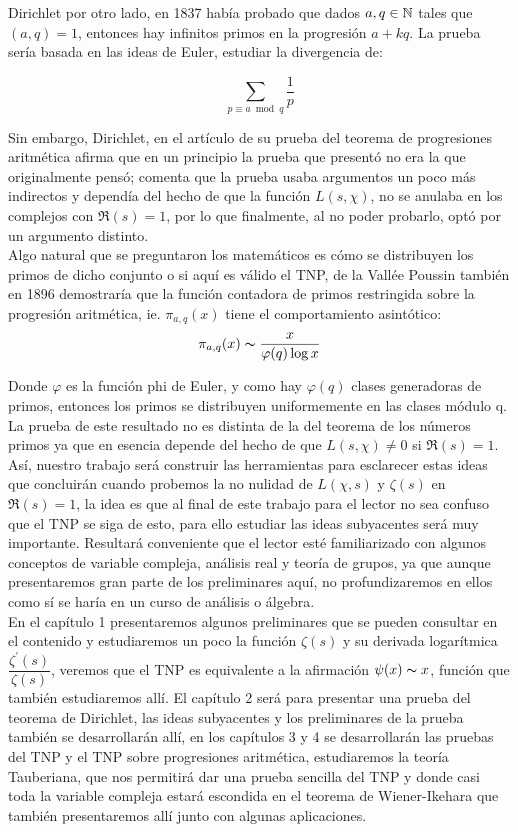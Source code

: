 Dirichlet por otro lado, en 1837 había probado que dados $a,q \in \mathbb{N}$ tales que $(a,q)=1$, entonces hay infinitos primos en la progresión $a+kq$. La prueba sería basada en las ideas de Euler, estudiar  la divergencia de:

$$\sum_{p \equiv a \bmod q}\frac{1}{p}$$

Sin embargo, Dirichlet, en el artículo de su prueba del teorema de progresiones aritmética afirma que en un principio la prueba que presentó no era la que originalmente pensó; comenta que la prueba usaba argumentos un poco más indirectos y dependía del hecho de que la función $L(s,\chi)$, no se anulaba en los complejos con $\Re(s)=1$, por lo que finalmente, al no poder probarlo, optó por un argumento distinto.\\

Algo natural que se preguntaron los matemáticos es cómo se distribuyen los primos de dicho conjunto o si aquí es válido el TNP, de la Vallée Poussin también en 1896 demostraría que la función contadora de primos restringida sobre la progresión aritmética, ie. $\pi_{a,q}(x)$ tiene el comportamiento asintótico:\\

$$\pi_{a,q}(x)\thicksim \frac{x}{\varphi(q)\log x} $$

Donde $\varphi$ es la función phi de Euler, y como hay $\varphi(q)$ clases generadoras de primos, entonces los primos se distribuyen uniformemente en las clases módulo q.\\

La prueba de este resultado no es distinta de la del teorema de los números primos ya que en esencia depende del hecho de que $L(s,\chi)\neq 0$ si $\Re(s)=1$. Así, nuestro trabajo será construir las herramientas para esclarecer estas ideas que concluirán cuando probemos la no nulidad de $L(\chi,s)$ y $\zeta(s)$ en $\Re(s)=1$, la idea es que al final de este trabajo para el lector no sea confuso que el TNP se siga de esto, para ello estudiar las ideas subyacentes será muy importante. Resultará conveniente que el lector esté familiarizado con algunos conceptos de variable compleja, análisis real y teoría de grupos, ya que aunque presentaremos gran parte de los preliminares aquí, no profundizaremos en ellos como sí se haría en un curso de análisis o álgebra.\\

En el capítulo 1 presentaremos algunos preliminares que se pueden consultar en el contenido y estudiaremos un poco la función $\zeta(s)$ y su derivada logarítmica $\dfrac{\zeta^{\prime}(s)}{\zeta(s)}$, veremos que el TNP es equivalente a la afirmación $\psi(x)\thicksim x$, función que también estudiaremos allí. El capítulo 2 será para presentar una prueba del teorema de Dirichlet, las ideas subyacentes y los preliminares de la  prueba también se desarrollarán allí, en los capítulos 3 y 4 se desarrollarán las pruebas del TNP y el TNP sobre progresiones aritmética, estudiaremos la teoría Tauberiana, que nos permitirá dar una prueba sencilla del TNP y donde casi toda  la variable compleja estará escondida en el teorema de Wiener-Ikehara que también presentaremos allí junto con algunas aplicaciones.